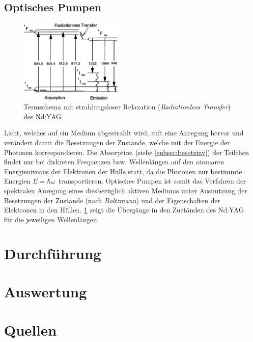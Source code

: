 \documentclass[numbers=noenddot,12pt,a4paper]{scrartcl}
\newcommand{\tilt}[1]{\textit{#1}}
\begin{document}
\subsection{Optisches Pumpen}\label{subsec:optpump}
\begin{figure}
	\vspace{-0.75cm}
	\includegraphics[width=0.45\textwidth]{uebergaenge.png}
	\caption{Termschema mit strahlungsloser Relaxation (\tilt{Radiationless Transfer}) des Nd:YAG}\label{img:übergänge}
\end{figure}
Licht, welches auf ein Medium abgestrahlt wird, ruft eine Anregung hervor und verändert damit die Besetzungen der Zustände, welche mit der Energie der Photonen korrespondieren. Die Absorption (siehe \ref{subsec:besetzinv}) der Teilchen findet nur bei diskreten Frequenzen bzw. Wellenlängen auf den atomaren Energieniveaus der Elektronen der Hülle statt, da die Photonen nur bestimmte Energien $E=\hbar\omega\,$ transportieren. Optisches Pumpen ist somit das Verfahren der spektralen Anregung eines diesbezüglich aktiven Mediums unter Ausnutzung der Besetzungen der Zustände (nach \tilt{Boltzmann}) und der Eigenschaften der Elektronen in den Hüllen. \ref{img:übergänge} zeigt die Übergänge in den Zuständen des Nd:YAG für die jeweiligen Wellenlängen.
\section{Durchführung}
\section{Auswertung}
\section{Quellen}
\end{document}
